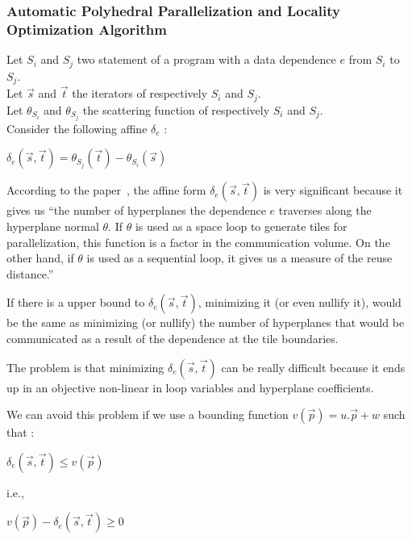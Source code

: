\documentclass[paper=a4, fontsize=11pt]{scrartcl}
\numberwithin{equation}{section}        %
\numberwithin{figure}{section}          %
\numberwithin{table}{section}               %
\begin{document}
        \subsubsection{Automatic Polyhedral Parallelization and Locality Optimization Algorithm}
            Let $S_i$ and $S_j$ two statement of a program with a data dependence $e$
            from $S_i$ to $S_j$.\\
            Let $\vec{s}$ and $\vec{t}$ the iterators of respectively $S_i$ and $S_j$.\\
            Let $\theta_{S_i}$ and $\theta_{S_j}$ the scattering function of respectively $S_i$
            and $S_j$.\\
            Consider the following affine $\delta_e$ :
            \begin{center}
                $\delta_e\left(\vec{s},\vec{t}\right) = \theta_{S_j}\left(\vec{t}\right) - \theta_{S_i}\left(\vec{s}\right)$
            \end{center}

            According to the paper~\cite{Bondhugula:2008:PAP:1379022.1375595},
            the affine form $\delta_e\left(\vec{s},\vec{t}\right)$ is very significant
            because it gives us ``the number of hyperplanes the dependence $e$ traverses
            along the hyperplane normal $\theta$. If $\theta$ is used as a space loop to generate tiles
            for parallelization, this function is a factor in the communication
            volume. On the other hand, if $\theta$ is used as a sequential loop, it
            gives us a measure of the reuse distance.''

            If there is a upper bound to $\delta_e\left(\vec{s},\vec{t}\right)$,
            minimizing it (or even nullify it), would be the same as minimizing (or nullify)
            the number of hyperplanes that would be communicated as a result of
            the dependence at the tile boundaries.

            The problem is that minimizing $\delta_e\left(\vec{s},\vec{t}\right)$
            can be really difficult because it ends up in an objective non-linear
            in loop variables and hyperplane coefficients.

            We can avoid this problem if we use a bounding function $v(\vec{p}) = u.\vec{p} + w$ such that :
            \begin{center}
                $\delta_e\left(\vec{s},\vec{t}\right) \leq v(\vec{p})$
            \end{center}
            i.e.,
            \begin{center}
                $v(\vec{p}) - \delta_e\left(\vec{s},\vec{t}\right) \geq 0$
            \end{center}
\end{document}

